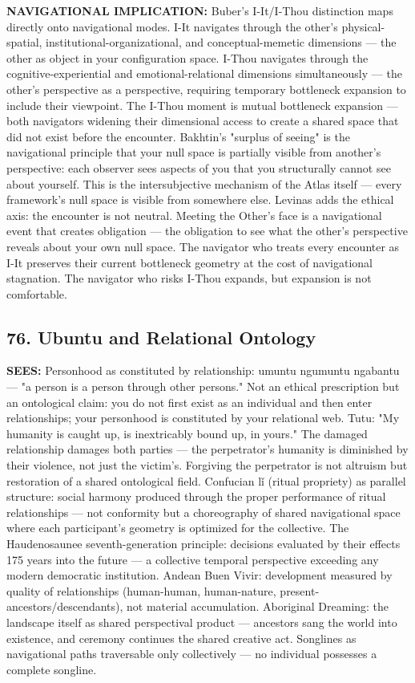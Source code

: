 \textbf{NAVIGATIONAL IMPLICATION:} Buber's I-It/\allowbreak I-Thou distinction maps directly onto navigational modes. I-It navigates through the other's physical-spatial, institutional-organizational, and conceptual-memetic dimensions — the other as object in your configuration space. I-Thou navigates through the cognitive-experiential and emotional-relational dimensions simultaneously — the other's perspective as a perspective, requiring temporary bottleneck expansion to include their viewpoint. The I-Thou moment is mutual bottleneck expansion — both navigators widening their dimensional access to create a shared space that did not exist before the encounter. Bakhtin's "surplus of seeing" is the navigational principle that your null space is partially visible from another's perspective: each observer sees aspects of you that you structurally cannot see about yourself. This is the intersubjective mechanism of the Atlas itself — every framework's null space is visible from somewhere else. Levinas adds the ethical axis: the encounter is not neutral. Meeting the Other's face is a navigational event that creates obligation — the obligation to see what the other's perspective reveals about your own null space. The navigator who treats every encounter as I-It preserves their current bottleneck geometry at the cost of navigational stagnation. The navigator who risks I-Thou expands, but expansion is not comfortable.


\bigskip\noindent\makebox[\textwidth]{\color{rulegray}\rule{5cm}{0.3pt}}\bigskip


\subsection*{76. Ubuntu and Relational Ontology}


\textbf{SEES:} Personhood as constituted by relationship: umuntu ngumuntu ngabantu — "a person is a person through other persons." Not an ethical prescription but an ontological claim: you do not first exist as an individual and then enter relationships; your personhood is constituted by your relational web. Tutu: "My humanity is caught up, is inextricably bound up, in yours." The damaged relationship damages both parties — the perpetrator's humanity is diminished by their violence, not just the victim's. Forgiving the perpetrator is not altruism but restoration of a shared ontological field. Confucian l\v{i} (ritual propriety) as parallel structure: social harmony produced through the proper performance of ritual relationships — not conformity but a choreography of shared navigational space where each participant's geometry is optimized for the collective. The Haudenosaunee seventh-generation principle: decisions evaluated by their effects 175 years into the future — a collective temporal perspective exceeding any modern democratic institution. Andean Buen Vivir: development measured by quality of relationships (human-human, human-nature, present-ancestors/\allowbreak descendants), not material accumulation. Aboriginal Dreaming: the landscape itself as shared perspectival product — ancestors sang the world into existence, and ceremony continues the shared creative act. Songlines as navigational paths traversable only collectively — no individual possesses a complete songline.


